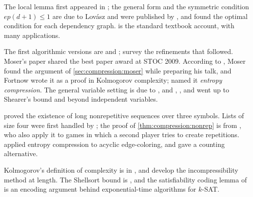 \begin{refsection}
\notesandrefs

The local lemma first appeared in \textcite{ErdosLovasz1975}; the general form and the symmetric condition $ep(d+1)\le1$ are due to Lov\'asz and were published by \textcite{Spencer1977}, and \textcite{Shearer1985} found the optimal condition for each dependency graph. \Textcite[Chapter~5]{AlonSpencer2008} is the standard textbook account, with many applications.

The first algorithmic versions are \textcite{Beck1991} and \textcite{Alon1991}; \textcite{MoserTardos2010} survey the refinements that followed. Moser's paper \parencite{Moser2009} shared the best paper award at STOC 2009. According to \textcite{Fortnow2009}, Moser found the argument of \cref{sec:compression:moser} while preparing his talk, and Fortnow wrote it as a proof in Kolmogorov complexity; \textcite{Tao2009} named it \emph{entropy compression}. The general variable setting is due to \textcite{MoserTardos2010}, and \textcite{KolipakaSzegedy2011}, \textcite{HarveyVondrak2015}, and \textcite{AchlioptasIliopoulos2016} went up to Shearer's bound and beyond independent variables.

\Textcite{Thue1906} proved the existence of long nonrepetitive sequences over three symbols. Lists of size four were first handled by \textcite{GrytczukPrzybyloZhu2011}; the proof of \cref{thm:compression:nonrep} is from \textcite{GrytczukKozikMicek2013}, who also apply it to games in which a second player tries to create repetitions. \Textcite{EsperetParreau2013} applied entropy compression to acyclic edge-coloring, and \textcite{Rosenfeld2020} gave a counting alternative.

Kolmogorov's definition of complexity is in \textcite{Kolmogorov1965}, and \textcite{LiVitanyi2008} develop the incompressibility method at length. The Shellsort bound is \textcite{JiangLiVitanyi2000}, and the satisfiability coding lemma of \textcite{PaturiPudlakZane1997} is an encoding argument behind exponential-time algorithms for $k$-SAT.

\printchapterbib
\end{refsection}
